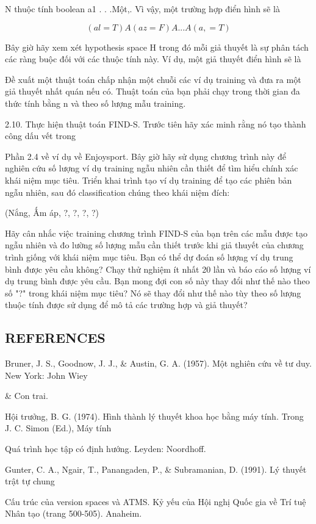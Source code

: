 N thuộc tính boolean a1 . . .Một,. Vì vậy, một trường hợp điển hình sẽ là

\[(al = T) A (az = F ) A . . . A (a, = T)\]

Bây giờ hãy xem xét hypothesis space H trong đó mỗi giả thuyết là sự phân tách các ràng buộc đối với các thuộc tính này. Ví dụ, một giả thuyết điển hình sẽ là

Đề xuất một thuật toán chấp nhận một chuỗi các ví dụ training và đưa ra một giả thuyết nhất quán nếu có. Thuật toán của bạn phải chạy trong thời gian đa thức tính bằng n và theo số lượng mẫu training.

2.10. Thực hiện thuật toán FIND-S. Trước tiên hãy xác minh rằng nó tạo thành công dấu vết trong

Phần 2.4 về ví dụ về Enjoysport. Bây giờ hãy sử dụng chương trình này để nghiên cứu số lượng ví dụ training ngẫu nhiên cần thiết để tìm hiểu chính xác khái niệm mục tiêu. Triển khai trình tạo ví dụ training để tạo các phiên bản ngẫu nhiên, sau đó classification chúng theo khái niệm đích:

(Nắng, Ấm áp, ?, ?, ?, ?)

Hãy cân nhắc việc training chương trình FIND-S của bạn trên các mẫu được tạo ngẫu nhiên và đo lường số lượng mẫu cần thiết trước khi giả thuyết của chương trình giống với khái niệm mục tiêu. Bạn có thể dự đoán số lượng ví dụ trung bình được yêu cầu không? Chạy thử nghiệm ít nhất 20 lần và báo cáo số lượng ví dụ trung bình được yêu cầu. Bạn mong đợi con số này thay đổi như thế nào theo số "?" trong khái niệm mục tiêu? Nó sẽ thay đổi như thế nào tùy theo số lượng thuộc tính được sử dụng để mô tả các trường hợp và giả thuyết?

\subsection{REFERENCES}

Bruner, J. S., Goodnow, J. J., \& Austin, G. A. (1957). Một nghiên cứu về tư duy. New York: John Wiey

\& Con trai.

Hội trưởng, B. G. (1974). Hình thành lý thuyết khoa học bằng máy tính. Trong J. C. Simon (Ed.), Máy tính

Quá trình học tập có định hướng. Leyden: Noordhoff.

Gunter, C. A., Ngair, T., Panangaden, P., \& Subramanian, D. (1991). Lý thuyết trật tự chung

Cấu trúc của version spaces và ATMS. Kỷ yếu của Hội nghị Quốc gia về Trí tuệ Nhân tạo (trang 500-505). Anaheim.

